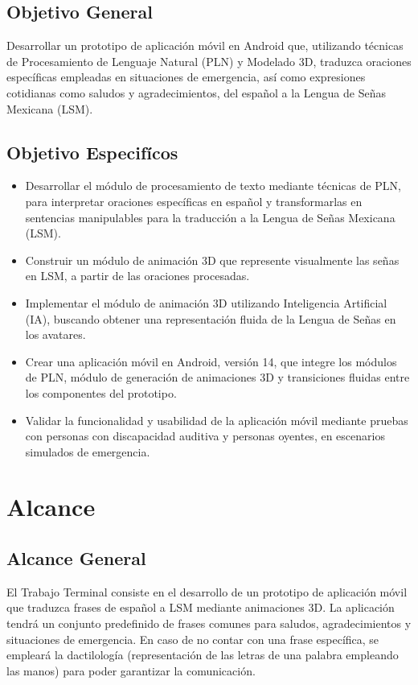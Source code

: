 \subsection{Objetivo General}
Desarrollar un prototipo de aplicación móvil en Android que, utilizando técnicas de Procesamiento de Lenguaje Natural (PLN) y Modelado 3D, traduzca oraciones específicas empleadas en situaciones de emergencia, así como expresiones cotidianas como saludos y agradecimientos, del español a la Lengua de Señas Mexicana (LSM).

\subsection{Objetivo Especifícos}
\begin{itemize}
    \item Desarrollar el módulo de procesamiento de texto mediante técnicas de PLN, para interpretar oraciones específicas en español y transformarlas en sentencias manipulables para la traducción a la Lengua de Señas Mexicana (LSM).
    \item Construir un módulo de animación 3D que represente visualmente las señas en LSM, a partir de las oraciones procesadas.
    \item Implementar el módulo de animación 3D utilizando Inteligencia Artificial (IA), buscando obtener una representación fluida de la Lengua de Señas en los avatares.
    \item Crear una aplicación móvil en Android, versión 14, que integre los módulos de PLN, módulo de generación de animaciones 3D y transiciones fluidas entre los componentes del prototipo.
    \item Validar la funcionalidad y usabilidad de la aplicación móvil mediante pruebas con personas con discapacidad auditiva y personas oyentes, en escenarios simulados de emergencia.
\end{itemize}

\section{Alcance}
\subsection{Alcance General}
El Trabajo Terminal consiste en el desarrollo de un prototipo de aplicación móvil que traduzca frases de español a LSM mediante animaciones 3D. La aplicación tendrá un conjunto predefinido de frases comunes para saludos, agradecimientos y situaciones de emergencia. En caso de no contar con una frase específica, se empleará la dactilología (representación de las letras de una palabra empleando las manos) para poder garantizar la comunicación.

